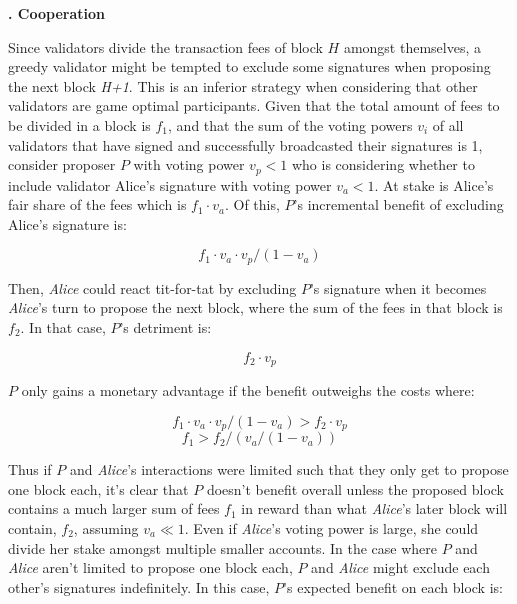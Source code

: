\documentclass[letter,11pt]{article}
\newcounter{myseccnt}     %
\newcounter{mysubseccnt}  %
\newcommand{\mysubsection}[1]
{\vspace{0mm}\noindent\fontsize{13pt}{15pt}\color{black!50}
\stepcounter{mysubseccnt}\textbf{\arabic{myseccnt}.\arabic{mysubseccnt} #1}\normalsize\vspace{5mm}\color{black}}
\begin{document}
\mysubsection{Cooperation}

Since validators divide the transaction fees of block $H$ amongst themselves, a greedy validator might be tempted to exclude some signatures when proposing the next block \textit{H+1}.  This is an inferior strategy when considering that other validators are game optimal participants.  Given that the total amount of fees to be divided in a block is $f_1$, and that the sum of the voting powers $v_i$ of all validators that have signed and successfully broadcasted their signatures is 1, consider proposer $P$ with voting power $v_p < 1$ who is considering whether to include validator Alice’s signature with voting power $v_a < 1$.  At stake is Alice’s fair share of the fees which is $f_1 \cdot v_a$.  Of this, $P$’s incremental benefit of excluding Alice’s signature is:

\begin{equation*}
 f_1 \cdot v_a \cdot v_p / (1 - v_a)
\end{equation*}

Then, \textit{Alice} could react tit-for-tat by excluding $P$’s signature when it becomes \textit{Alice}’s turn to propose the next block, where the sum of the fees in that block is $f_2$.  In that case, $P$’s detriment is:

\begin{equation*}
 f_2 \cdot v_p
\end{equation*}

$P$ only gains a monetary advantage if the benefit outweighs the costs where:

\begin{equation*}
 f_1 \cdot v_a \cdot v_p / (1 - v_a)  >  f_2 \cdot v_p
\end{equation*}
\begin{equation*}
f_1  >  f_2  / (v_a / (1 - v_a))
\end{equation*}


Thus if $P$ and \textit{Alice}’s interactions were limited such that they only get to propose one block each, it’s clear that $P$ doesn’t benefit overall unless the proposed block contains a much larger sum of fees $f_1$ in reward than what \textit{Alice}’s later block will contain, $f_2$, assuming $v_a \ll 1$.  Even if \textit{Alice}’s voting power is large, she could divide her stake amongst multiple smaller accounts. In the case where $P$ and \textit{Alice} aren’t limited to propose one block each, $P$ and \textit{Alice} might exclude each other’s signatures indefinitely.  In this case, $P$’s expected benefit on each block is:
\end{document}
